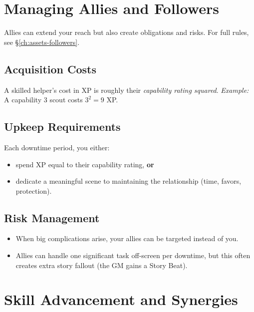 \section{Managing Allies and Followers}
\label{sec:allies-followers}

Allies can extend your reach but also create obligations and risks. For full
rules, see \S\ref{ch:assets-followers}.

\subsection{Acquisition Costs}
\label{sec:follower-cost}
A skilled helper's cost in XP is roughly their \emph{capability rating squared}.
\emph{Example:} A capability 3 scout costs $3^2 = 9$ XP.

\subsection{Upkeep Requirements}
\label{sec:follower-upkeep}
Each downtime period, you either:
\begin{itemize}
  \item spend XP equal to their capability rating, \textbf{or}
  \item dedicate a meaningful scene to maintaining the relationship (time, favors, protection).
\end{itemize}

\subsection{Risk Management}
\label{sec:follower-risk}
\begin{itemize}
  \item When big complications arise, your allies can be targeted instead of you.
  \item Allies can handle one significant task off‑screen per downtime, but this often creates extra story fallout (the GM gains a Story Beat).
\end{itemize}

\section{Skill Advancement and Synergies}
\label{sec:skill-advancement}

